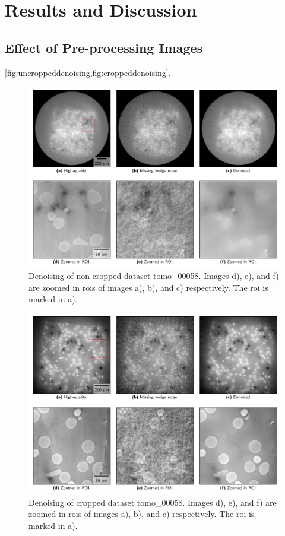 \chapter{Results and Discussion}
\label{sec:results}

\section{Effect of Pre-processing Images}

\cref{fig:uncroppeddenoising,fig:croppeddenoising}.

\begin{figure}[htbp]
  \centering
  \includegraphics[width=.9\textwidth]{figures/uncroppeddenoising.pdf}
  \caption[Non-cropped image denoising]{Denoising of non-cropped dataset tomo\_00058. Images d), e), and f) are zoomed in \acrshort{roi}s of images a), b), and c) respectively. The \acrshort{roi} is marked in a). }
  \label{fig:uncroppeddenoising}
\end{figure}

\begin{figure}[htbp]
  \centering
  \includegraphics[width=.9\textwidth]{figures/croppeddenoising.pdf}
  \caption[Cropped image denoising]{Denoising of cropped dataset tomo\_00058. Images d), e), and f) are zoomed in \acrshort{roi}s of images a), b), and c) respectively. The \acrshort{roi} is marked in a). }
  \label{fig:croppeddenoising}
\end{figure}


